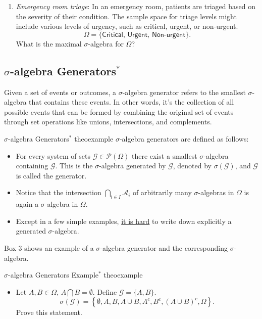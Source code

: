 \documentclass{tufte-handout}
\begin{document}
\begin{enumerate}
 \item \textit{Emergency room triage}: In an emergency room, patients are triaged based on the severity of their condition. The sample space for triage levels might include various levels of urgency, such as critical, urgent, or non-urgent.
$$\Omega = \{\textsf{Critical, Urgent, Non-urgent}\}.$$
 What is the maximal $\sigma$-algebra for $\Omega$?
\end{enumerate}

\subsection{ $\sigma$-algebra Generators$^*$ }

Given a set of events or outcomes, a $\sigma$-algebra generator refers to the smallest $\sigma$-algebra that contains these events. In other words, it's the collection of all possible events that can be formed by combining the original set of events through set operations like unions, intersections, and complements.

\begin{mydef}{$\sigma$-algebra Generators$^*$ }{theoexample}  
$\sigma$-algebra generators are defined as follows:
\begin{itemize}
\item For every system of sets $\mathscr G \in \mathscr P(\Omega)$ there exist a smallest $\sigma$-algebra containing $\mathscr G$. This is the $\sigma$-algebra generated by $\mathscr G$, denoted by $\sigma(\mathscr G)$, and $\mathscr G$ is called the generator.
\item Notice that the intersection  $\bigcap_{i \in I} \mathscr A_i$ of arbitrarily many $\sigma$-algebras in $\Omega$ is again a $\sigma$-algebra in $\Omega$.
\item Except in a few simple examples, \underline{it is hard} to write down explicitly a generated $\sigma$-algebra.
\end{itemize}
\end{mydef}
Box 3 shows an example of a $\sigma$-algebra generator and the corresponding $\sigma$-algebra.
\begin{mybox}{ $\sigma$-algebra Generators Example$^*$ }{theoexample} 
\begin{itemize}
\item  Let $A,B \in \Omega$, $A\bigcap B = \emptyset$. Define $\mathscr G = \{A,B\}$.
\begin{equation*}
\sigma(\mathscr G) = \left\{\emptyset, A,B,A\cup B, A^c,B^c, (A\cup B)^c,\Omega\right\}.
\end{equation*}
Prove this statement.
\end{itemize}
\end{mybox}
\end{document}
